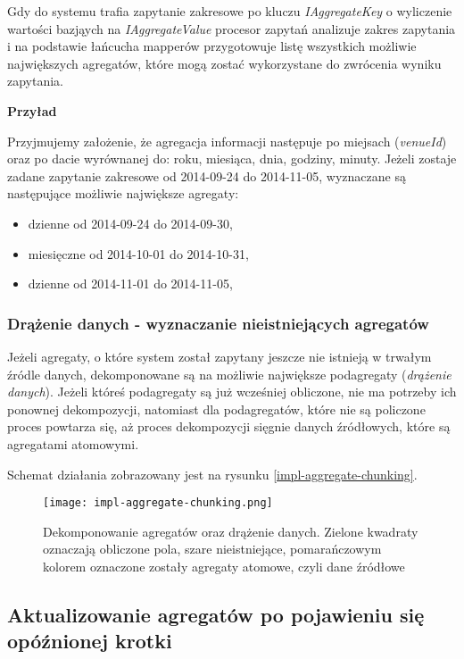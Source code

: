 Gdy do systemu trafia zapytanie zakresowe po kluczu \emph{IAggregateKey} o wyliczenie wartości bazjąych na \emph{IAggregateValue} procesor zapytań analizuje zakres zapytania i na podstawie łańcucha mapperów przygotowuje listę wszystkich możliwie największych agregatów, które mogą zostać wykorzystane do zwrócenia wyniku zapytania.

\textbf{Przyład}

Przyjmujemy założenie, że agregacja informacji następuje po miejsach (\emph{venueId}) oraz po dacie wyrównanej do: roku, miesiąca, dnia, godziny, minuty. Jeżeli zostaje zadane zapytanie zakresowe od 2014-09-24 do 2014-11-05, wyznaczane są następujące możliwie największe agregaty:

\begin{itemize}[noitemsep]
  \item dzienne od 2014-09-24 do 2014-09-30,
  \item miesięczne od 2014-10-01 do 2014-10-31,
  \item dzienne od 2014-11-01 do 2014-11-05,
\end{itemize}

\subsubsection{Drążenie danych - wyznaczanie nieistniejących agregatów}
\label{sec:impl-mal-computing-aggregates}

Jeżeli agregaty, o które system został zapytany jeszcze nie istnieją w trwałym źródle danych, dekomponowane są na możliwie największe podagregaty (\emph{drążenie danych}). Jeżeli któreś podagregaty są już wcześniej obliczone, nie ma potrzeby ich ponownej dekompozycji, natomiast dla podagregatów, które nie są policzone proces powtarza się, aż proces dekompozycji sięgnie danych źródłowych, które są agregatami atomowymi.

Schemat działania zobrazowany jest na rysunku \ref{impl-aggregate-chunking}.

\begin{figure}[h!]
  \centering
    \texttt{[image: impl-aggregate-chunking.png]}
  \caption{Dekomponowanie agregatów oraz drążenie danych. Zielone kwadraty oznaczają obliczone pola, szare nieistniejące, pomarańczowym kolorem oznaczone zostały agregaty atomowe, czyli dane źródłowe}
  \label{fig:impl-aggregate-chunking}
\end{figure}

\subsection{Aktualizowanie agregatów po pojawieniu się opóźnionej krotki}

